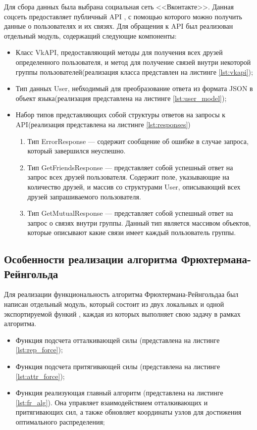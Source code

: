 \documentclass[14pt, russian]{scrartcl}
\begin{document}
Для сбора данных была выбрана социальная сеть <<Вконтакте>>. Данная соцсеть предоставляет публичный API \cite{VKAPI}, с помощью которого можно получить данные о пользователях и их связях. Для обращения к API был реализован отдельный модуль, содержащий следующие компоненты:

\begin{itemize}
	\item Класс VkAPI, предоставляющий методы для получения всех друзей определенного пользователя, и метод для получение связей внутри некоторой группы пользователей(реализация класса представлен на листинге \ref{lst:vkapi});
	\item Тип данных User, небходимый для преобразование ответа из формата JSON в объект языка(реализация представлена на листинге \ref{lst:user_model});
	\item Набор типов представляющих собой структуры ответов на запросы к API(реализация представлена на листинге \ref{lst:responses})
	      \begin{enumerate}
		      \item Тип ErrorResponse --- содержит сообщение об ошибке в случае запроса, который завершился неуспешно.
		      \item Тип GetFriendsResponse --- представляет собой успешный ответ на запрос всех друзей пользователя. Содержит поле, указывающие на количество друзей, и массив со структурами User, описывающий всех друзей запрашиваемого пользователя.
		      \item Тип GetMutualResponse --- представляет собой успешный ответ на запрос о связях внутри группы. Данный тип является массивом объектов, которые описывают какие связи имеет каждый пользователь группы.
	      \end{enumerate}

\end{itemize}


\subsection{Особенности реализации алгоритма Фрюхтермана-Рейнгольда}

Для реализации функциональность алгоритма Фрюхтермана-Рейнгольдаа был написан отдельный модуль, который состоит из двух локальных и одной экспортируемой функий
, каждая из которых выполняет свою задачу в рамках алгоритма.

\begin{itemize}
	\item Функция подсчета отталкивающей силы (представлена на листинге \ref{lst:rep_force});
	\item Функция подсчета притягивающей силы (представлена на листинге \ref{lst:attr_force});
	\item Функция реализующая главный алгоритм (представлена на листинге \ref{lst:fr_alg}). Она управляет взаимодействием отталкивающих и притягивающих сил, а также обновляет координаты узлов для достижения оптимального распределения;

\end{itemize}
\end{document}
